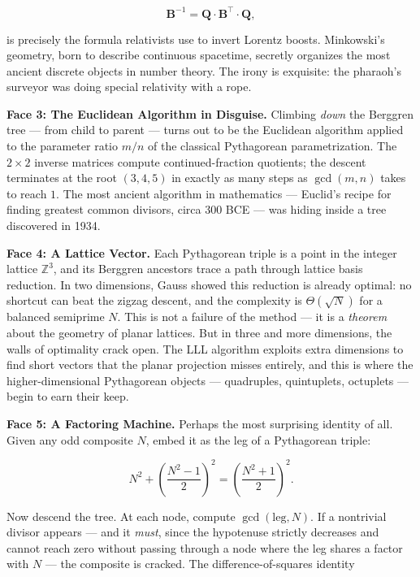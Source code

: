 \documentclass[11pt,twoside,openright]{book}
\theoremstyle{definition}
\theoremstyle{remark}
\begin{document}
\[\mathbf{B}^{-1} = \mathbf{Q} \cdot \mathbf{B}^{\!\top} \cdot \mathbf{Q},\]

is precisely the formula relativists use to invert Lorentz boosts. Minkowski's geometry, born to describe continuous spacetime, secretly organizes the most ancient discrete objects in number theory. The irony is exquisite: the pharaoh's surveyor was doing special relativity with a rope.

\textbf{Face 3: The Euclidean Algorithm in Disguise.} Climbing \textit{down} the Berggren tree --- from child to parent --- turns out to be the Euclidean algorithm applied to the parameter ratio $m/n$ of the classical Pythagorean parametrization. The $2 \times 2$ inverse matrices compute continued-fraction quotients; the descent terminates at the root $(3, 4, 5)$ in exactly as many steps as $\gcd(m, n)$ takes to reach $1$. The most ancient algorithm in mathematics --- Euclid's recipe for finding greatest common divisors, circa 300 BCE --- was hiding inside a tree discovered in 1934.

\textbf{Face 4: A Lattice Vector.} Each Pythagorean triple is a point in the integer lattice $\mathbb{Z}^3$, and its Berggren ancestors trace a path through lattice basis reduction. In two dimensions, Gauss showed this reduction is already optimal: no shortcut can beat the zigzag descent, and the complexity is $\Theta(\sqrt{N})$ for a balanced semiprime $N$. This is not a failure of the method --- it is a \textit{theorem} about the geometry of planar lattices. But in three and more dimensions, the walls of optimality crack open. The LLL algorithm exploits extra dimensions to find short vectors that the planar projection misses entirely, and this is where the higher-dimensional Pythagorean objects --- quadruples, quintuplets, octuplets --- begin to earn their keep.

\textbf{Face 5: A Factoring Machine.} Perhaps the most surprising identity of all. Given any odd composite $N$, embed it as the leg of a Pythagorean triple:

\[N^2 + \left(\frac{N^2 - 1}{2}\right)^{\!2} = \left(\frac{N^2 + 1}{2}\right)^{\!2}.\]

Now descend the tree. At each node, compute $\gcd(\text{leg}, N)$. If a nontrivial divisor appears --- and it \textit{must}, since the hypotenuse strictly decreases and cannot reach zero without passing through a node where the leg shares a factor with $N$ --- the composite is cracked. The difference-of-squares identity
\end{document}
